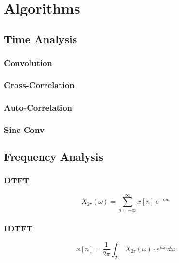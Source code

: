 

\chapter{Algorithms}
\section{Time Analysis}
\subsection{Convolution}
\subsection{Cross-Correlation}
\subsection{Auto-Correlation}

\subsection{Sinc-Conv}




\section{Frequency Analysis}
\subsection{DTFT}
\begin{equation}
    X_{2\pi}(\omega) = \sum_{n=-\infty}^{\infty} x[n] \,e^{-i \omega n}
\end{equation}


\subsection{IDTFT}
\begin{equation}
    x[n] = \frac{1}{2 \pi}\int_{2\pi} X_{2\pi}(\omega)\cdot e^{i \omega n} d\omega
\end{equation}

